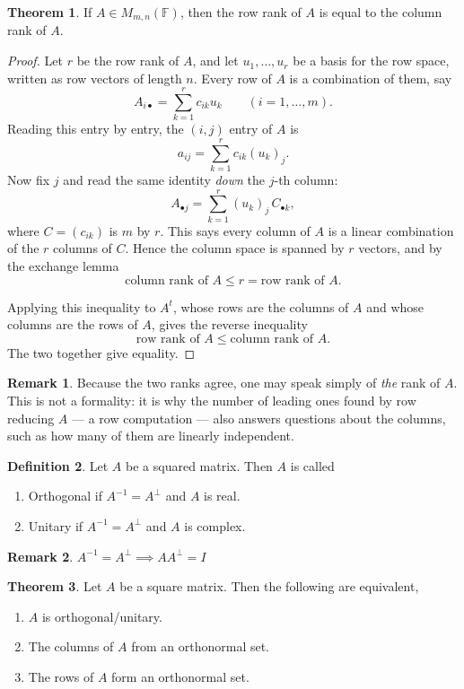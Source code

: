 \documentclass[11pt,a4paper]{article}
\theoremstyle{definition}
\newtheorem{thm}{Theorem}[subsection]
\newtheorem{defn}[thm]{Definition}
\newtheorem*{remark}{Remark}
\begin{document}
\begin{thm}\label{thm:row-column-rank}
If $A\in M_{m,n}(\mathbb{F})$, then the row rank of $A$ is equal to the column
rank of $A$.
\end{thm}

\begin{proof}
Let $r$ be the row rank of $A$, and let $u_1,\dots,u_r$ be a basis for the row
space, written as row vectors of length $n$. Every row of $A$ is a combination
of them, say
$$A_{i\bullet}=\sum_{k=1}^{r}c_{ik}u_k\qquad (i=1,\dots,m).$$
Reading this entry by entry, the $(i,j)$ entry of $A$ is
$$a_{ij}=\sum_{k=1}^{r}c_{ik}(u_k)_j.$$
Now fix $j$ and read the same identity \emph{down} the $j$-th column:
$$A_{\bullet j}=\sum_{k=1}^{r}(u_k)_j\,C_{\bullet k},$$
where $C=(c_{ik})$ is $m$ by $r$. This says every column of $A$ is a linear
combination of the $r$ columns of $C$. Hence the column space is spanned by $r$
vectors, and by the exchange lemma
$$\text{column rank of } A\leq r=\text{row rank of } A.$$

Applying this inequality to $A^t$, whose rows are the columns of $A$ and whose
columns are the rows of $A$, gives the reverse inequality
$$\text{row rank of } A\leq \text{column rank of } A.$$
The two together give equality.
\end{proof}

\begin{remark}
Because the two ranks agree, one may speak simply of \emph{the} rank of $A$.
This is not a formality: it is why the number of leading ones found by row
reducing $A$ --- a row computation --- also answers questions about the columns,
such as how many of them are linearly independent.
\end{remark}


\begin{defn}
Let $A$ be a squared matrix. Then $A$ is called
\begin{enumerate}
\item[i.] Orthogonal if $A^{-1}=A^{\perp}$ and $A$ is real.
\item[ii.] Unitary if $A^{-1}=A^{\perp}$ and $A$ is complex.
\end{enumerate}
\end{defn}


\begin{remark}
$A^{-1}=A^{\perp}\implies AA^{\perp}=I$
\end{remark}


\begin{thm}
Let $A$ be a square matrix. Then the following are equivalent,
\begin{enumerate}
\item[i.] $A$ is orthogonal/unitary.
\item[ii.] The columns of $A$ from an orthonormal set.
\item[iii.] The rows of $A$ form an orthonormal set.
\end{enumerate}
\end{thm}
\end{document}
